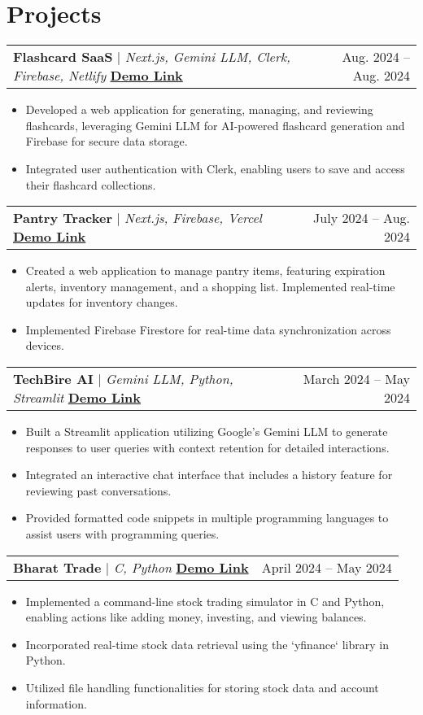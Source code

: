 \documentclass[letterpaper,11pt]{article}
\makeatletter
\newcommand{\resumeItem}[1]{
\item\small{
{#1 \vspace{-2pt}}
}
}
\newcommand{\resumeSubheading}[4]{
\vspace{-2pt}\item
\begin{tabular*}{0.97\textwidth}[t]{l@{\extracolsep{\fill}}r}
\textbf{#1} & #2 \\
\textit{\small#3} & \textit{\small #4} \\
\end{tabular*}\vspace{-7pt}
}
\newcommand{\resumeProjectHeading}[2]{
\item
\begin{tabular*}{0.97\textwidth}{l@{\extracolsep{\fill}}r}
\small#1 & #2 \\
\end{tabular*}\vspace{-7pt}
}
\newcommand{\resumeItemListStart}{\begin{itemize}}
\newcommand{\resumeItemListEnd}{\end{itemize}\vspace{-5pt}}
\makeatother
\begin{document}


\section{Projects}

\resumeProjectHeading
{\textbf{Flashcard SaaS} $|$ \emph{Next.js, Gemini LLM, Clerk, Firebase, Netlify} \textbf{\hfill \href{https://github.com/techbire/flashcard-saas}{Demo Link}}}{Aug. 2024 -- Aug. 2024}
\resumeItemListStart
\resumeItem{Developed a web application for generating, managing, and reviewing flashcards, leveraging Gemini LLM for AI-powered flashcard generation and Firebase for secure data storage.}
\resumeItem{Integrated user authentication with Clerk, enabling users to save and access their flashcard collections.}
\resumeItemListEnd

\resumeProjectHeading
{\textbf{Pantry Tracker} $|$ \emph{Next.js, Firebase, Vercel} \textbf{\hfill \href{https://github.com/techbire/pantry-tracker}{Demo Link}}}{July 2024 -- Aug. 2024}
\resumeItemListStart
\resumeItem{Created a web application to manage pantry items, featuring expiration alerts, inventory management, and a shopping list. Implemented real-time updates for inventory changes.}
\resumeItem{Implemented Firebase Firestore for real-time data synchronization across devices.}
\resumeItemListEnd

\resumeProjectHeading
{\textbf{TechBire AI} $|$ \emph{Gemini LLM, Python, Streamlit} \textbf{\hfill \href{https://github.com/techbire/techbire-AI}{Demo Link}}}{March 2024 -- May 2024}
\resumeItemListStart
\resumeItem{Built a Streamlit application utilizing Google's Gemini LLM to generate responses to user queries with context retention for detailed interactions.}
\resumeItem{Integrated an interactive chat interface that includes a history feature for reviewing past conversations.}
\resumeItem{Provided formatted code snippets in multiple programming languages to assist users with programming queries.}
\resumeItemListEnd

\resumeProjectHeading
{\textbf{Bharat Trade} $|$ \emph{C, Python} \textbf{\hfill \href{https://github.com/techbire/bharat-trade}{Demo Link}}}{April 2024 -- May 2024}
\resumeItemListStart
\resumeItem{Implemented a command-line stock trading simulator in C and Python, enabling actions like adding money, investing, and viewing balances.}
\resumeItem{Incorporated real-time stock data retrieval using the `yfinance` library in Python.}
\resumeItem{Utilized file handling functionalities for storing stock data and account information.}
\resumeItemListEnd
\end{document}
